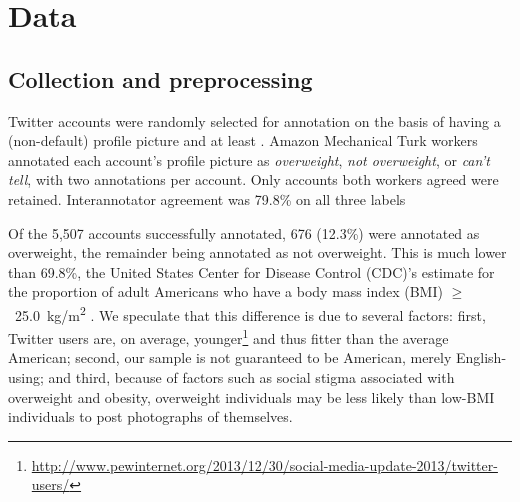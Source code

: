 \vspace{-1mm}
\section{Data}

\vspace{-1mm}
\subsection{Collection and preprocessing}

Twitter accounts were randomly selected for annotation on the basis of having a (non-default) profile picture and at least . %
Amazon Mechanical Turk workers annotated each account's profile picture as \textit{overweight}, \textit{not overweight}, or \textit{can't tell}, with two annotations per account. Only accounts  both workers agreed  were retained. Interannotator agreement was 79.8\%  on all three labels


Of the 5,507 accounts successfully annotated, 676 (12.3\%) were annotated as overweight, the remainder being annotated as not overweight. This is much lower than 69.8\%, the United States Center for Disease Control (CDC)'s estimate for the proportion of adult Americans who have a body mass index (BMI) %
$\geq$~25.0~kg/m\textsuperscript{2} \cite{nhanes2013}. We speculate that this difference is due to several factors: first, Twitter users are, on average, younger\footnote{\url{http://www.pewinternet.org/2013/12/30/social-media-update-2013/twitter-users/}} and thus fitter than the average American; second, our sample is not guaranteed to be American, merely English-using; and third, because of factors such as social stigma associated with overweight and obesity, overweight individuals may be less likely than low-BMI individuals to post photographs of themselves. %

